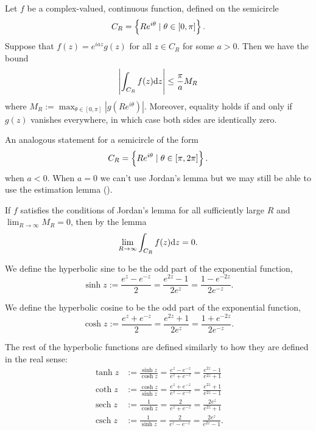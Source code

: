 \documentclass[11pt,a4paper]{article}
\begin{document}
\begin{lemma}
  Let $f$ be a complex-valued, continuous function, defined on the semicircle
  \[
    C_R = \left\{R e^{i \theta} \mid \theta \in [0,\pi]\right\}.
  \]
  Suppose that $f(z) = e^{i a z} g(z)$ for all $z \in C_R$
  for some $a > 0$.
  Then we have the bound
  \[
    \left\lvert\int_{C_R} f(z) \mathrm{d} z\right\rvert \le \frac{\pi}{a} M_R
  \]
  where $M_R := \max_{\theta \in [0,\pi]} |g(R e^{i \theta})|$.
  Moreover, equality holds if and only if $g(z)$ vanishes everywhere,
  in which case both sides are identically zero.
\end{lemma}
\begin{remark}
  An analogous statement for a semicircle of the form
  \[
    C_R = \left\{R e^{i \theta} \mid \theta \in [\pi,2\pi]\right\}.
  \]
  when $a < 0$.
  When $a = 0$ we can't use Jordan's lemma but we may still be able to use
  the estimation lemma ().
\end{remark}
\begin{remark}
  If $f$ satisfies the conditions of Jordan's lemma for all sufficiently
  large $R$ and $\lim_{R \to \infty} M_R = 0$,
  then by the lemma
  \[
    \lim_{R \to \infty} \int_{C_R} f(z) \mathrm{d} z = 0.
  \]
\end{remark}

\begin{definition}
  We define the hyperbolic sine to be the odd part of the exponential
  function,
  \[
    \sinh z :=
    \frac{e^{z} - e^{-z}}{2} =
    \frac{e^{2z} - 1}{2 e^{z}} =
    \frac{1 - e^{-2z}}{2 e^{-z}}. 
  \]
\end{definition}

\begin{definition}
  We define the hyperbolic cosine to be the odd part of the exponential
  function,
  \[
    \cosh z :=
    \frac{e^{z} + e^{-z}}{2} =
    \frac{e^{2z} + 1}{2 e^{z}} =
    \frac{1 + e^{-2z}}{2 e^{-z}}. 
  \]
\end{definition}

\begin{definition}
  The rest of the hyperbolic functions are defined similarly to how they
  are defined in the real sense:
  \begin{align*}
    \tanh z &:= \frac{\sinh z}{\cosh z} =
    \frac{e^{z}-e^{-z}}{e^{z}+e^{-z}} = \frac{e^{2z}-1}{e^{2z}+1} \\
    \coth z &:= \frac{\cosh z}{\sinh z} =
    \frac{e^{z}+e^{-z}}{e^{z}-e^{-z}} = \frac{e^{2z}+1}{e^{2z}-1} \\
    \operatorname{sech} z &:= \frac{1}{\cosh z} =
    \frac{2}{e^{z}+e^{-z}} = \frac{2e^{z}}{e^{2z}+1} \\
    \operatorname{csch} z &:= \frac{1}{\sinh z} =
    \frac{2}{e^{z}-e^{-z}} = \frac{2e^{z}}{e^{2z}-1}.
  \end{align*}
\end{definition}
\end{document}
